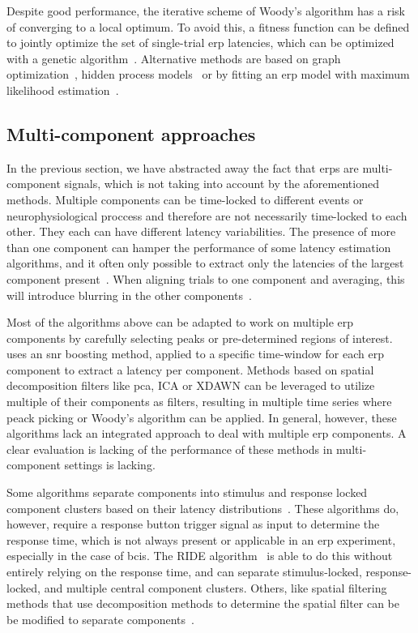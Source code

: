 Despite good performance, the iterative scheme of Woody's algorithm has a risk of converging to a local
optimum.
To avoid this, a fitness function can be defined to jointly optimize
the set of single-trial \ac{erp} latencies, which can be optimized with a genetic algorithm~\cite{Pelo2018}.
Alternative methods are based on graph
optimization~\cite{Dimitriadis2018}, hidden process models~\cite{Kim2020} or by fitting an \ac{erp} model with
maximum likelihood estimation~\cite{Gratton1989, Tuan1987, Moecks1988,Puce1994}.

\subsection{Multi-component approaches}
\label{sec:wcble/literature/multi-comp}
In the previous section, we have abstracted away the fact that \acp{erp} are
multi-component signals, which is not taking into account by the aforementioned
methods.
Multiple components can be time-locked to different events or neurophysiological
proccess and therefore are not necessarily time-locked to each other. They
each can have different latency variabilities.
The presence of more than one component can hamper the
performance of some latency estimation algorithms, and it often only possible to extract only the
latencies of the largest component present~\cite{Ouyang2017}. When aligning trials
to one component and averaging, this will introduce blurring in the other
components~\cite{Ouyang2020}.

Most of the algorithms above can be adapted to work on multiple \ac{erp} components
by carefully selecting peaks or pre-determined regions of interest.
\cite{Hardiansyah2020} uses an \ac{snr} boosting method, applied to a specific
time-window for each \ac{erp} component to extract a latency per component.
Methods based on spatial decomposition filters like \ac{pca}, ICA or XDAWN can be leveraged
to utilize multiple of their components as filters, resulting in multiple time
series where peack picking or Woody's algorithm can be applied. In general,
however, these algorithms lack an integrated approach to deal with multiple
\ac{erp} components. A clear evaluation is lacking of the performance of these
methods in
multi-component settings is lacking.

Some algorithms separate components into stimulus and response locked component clusters based on their
latency distributions~\cite{Jung2001, Takeda2008,	Zhang1998, Yin2009}.
These algorithms do, however, require a response
button trigger signal as input to determine the response time, which is
not always present or applicable in an \ac{erp} experiment, especially in
the case of \acp{bci}.
The RIDE algorithm~\cite{Ouyang2011, Ouyang2015,	Wang2015, Ouyang2016, Ouyang2020}
is able to do this without entirely relying on the response time, and can
separate stimulus-locked, response-locked, and multiple central component clusters.
Others, like spatial filtering methods that use decomposition methods to
determine the spatial filter can be be modified to separate
components~\cite{Ouyang2017}.

